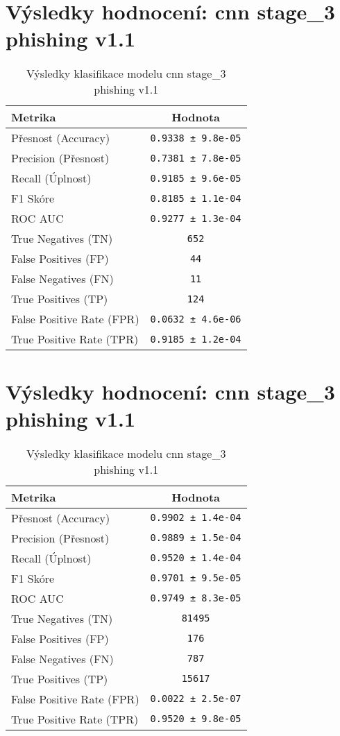 \section*{Výsledky hodnocení: cnn stage_3 phishing v1.1}
\begin{table}[h!]
\centering
\begin{tabular}{|l|c|}
\hline
\textbf{Metrika} & \textbf{Hodnota} \\
\hline
Přesnost (Accuracy) & \texttt{0.9338 ± 9.8e-05} \\
Precision (Přesnost) & \texttt{0.7381 ± 7.8e-05} \\
Recall (Úplnost) & \texttt{0.9185 ± 9.6e-05} \\
F1 Skóre & \texttt{0.8185 ± 1.1e-04} \\
ROC AUC & \texttt{0.9277 ± 1.3e-04} \\
True Negatives (TN) & \texttt{652} \\
False Positives (FP) & \texttt{44} \\
False Negatives (FN) & \texttt{11} \\
True Positives (TP) & \texttt{124} \\
False Positive Rate (FPR) & \texttt{0.0632 ± 4.6e-06} \\
True Positive Rate (TPR) & \texttt{0.9185 ± 1.2e-04} \\
\hline
\end{tabular}
\caption{Výsledky klasifikace modelu cnn stage_3 phishing v1.1}
\label{tab:phishing_cnn}
\end{table}

\section*{Výsledky hodnocení: cnn stage_3 phishing v1.1}
\begin{table}[h!]
\centering
\begin{tabular}{|l|c|}
\hline
\textbf{Metrika} & \textbf{Hodnota} \\
\hline
Přesnost (Accuracy) & \texttt{0.9902 ± 1.4e-04} \\
Precision (Přesnost) & \texttt{0.9889 ± 1.5e-04} \\
Recall (Úplnost) & \texttt{0.9520 ± 1.4e-04} \\
F1 Skóre & \texttt{0.9701 ± 9.5e-05} \\
ROC AUC & \texttt{0.9749 ± 8.3e-05} \\
True Negatives (TN) & \texttt{81495} \\
False Positives (FP) & \texttt{176} \\
False Negatives (FN) & \texttt{787} \\
True Positives (TP) & \texttt{15617} \\
False Positive Rate (FPR) & \texttt{0.0022 ± 2.5e-07} \\
True Positive Rate (TPR) & \texttt{0.9520 ± 9.8e-05} \\
\hline
\end{tabular}
\caption{Výsledky klasifikace modelu cnn stage_3 phishing v1.1}
\label{tab:phishing_cnn}
\end{table}

